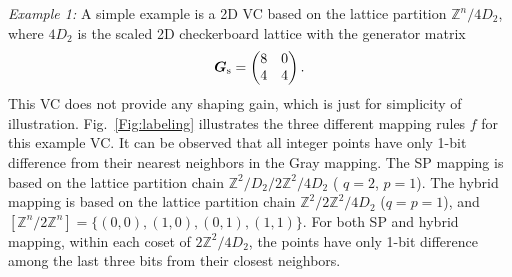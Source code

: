 \documentclass[journal]{IEEEtran}
\newcommand{\Z}{\mathbb{Z}}
\newcommand{\bGs}{\boldsymbol{G}_\mathrm{s}}
\begin{document}
\emph{Example 1:} A simple example is a 2D VC based on the lattice partition $\Z^n/4D_2$, where $4D_2$ is the scaled 2D checkerboard lattice with the generator matrix
\begin{align}
\bGs=\begin{pmatrix}
8 & 0\\ 
4 & 4
\end{pmatrix}.\notag
\end{align}
This VC does not provide any shaping gain, which is just for simplicity of illustration. Fig.~\ref{Fig:labeling} illustrates the three different mapping rules $f$ for this example VC. It can be observed that all integer points have only 1-bit difference from their nearest neighbors in the Gray mapping. The SP mapping is based on the lattice partition chain $\Z^2/D_2/2\Z^2/4D_2$ ( $q=2$, $p=1$). The hybrid mapping is based on the lattice partition chain $\Z^2/2\Z^2/4D_2$ ($q=p=1$), and ${[\Z^n/2\Z^n]=\{(0,0),(1,0),(0,1),(1,1)}\}$. For both SP and hybrid mapping, within each coset of $2\Z^2/4D_2$, the points have only 1-bit difference among the last three bits from their closest neighbors. 
\end{document}
